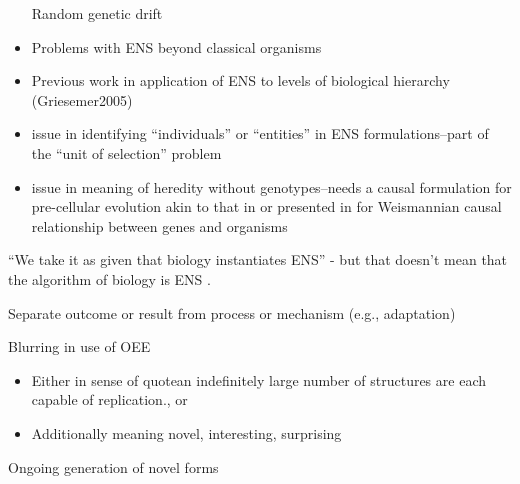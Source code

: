 \begin{itemize}
	Random genetic drift
	\item
	Problems with ENS beyond classical organisms
	\item
	Previous work in application of ENS to levels of biological hierarchy
	(Griesemer2005)
	\item
	issue in identifying ``individuals'' or ``entities'' in ENS
	formulations--part of the ``unit of selection'' problem
	\item
	issue in meaning of heredity without genotypes--needs a causal
	formulation for pre-cellular evolution akin to that in
	\autocite{Bourrat2015} or presented in \autocite{Griesemer2005} for
	Weismannian causal relationship between genes and organisms
\end{itemize}

``We take it as given that biology instantiates ENS'' - but that doesn't mean that the algorithm of biology is ENS \autocite{Watson2012}.




Separate outcome or result from process or mechanism (e.g., adaptation)

Blurring in use of OEE

\begin{itemize}
	\item Either in sense of quote{an indefinitely large number of structures are each capable of replication.}{\autocite{MaynardSmith1999}}, or
	\item Additionally meaning novel, interesting, surprising
\end{itemize}

Ongoing generation of novel forms

